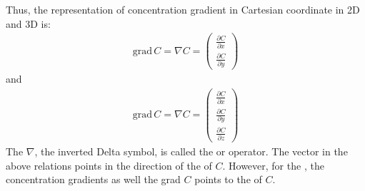 \documentclass[letterpaper,10pt,english]{jupyterBook}
\begin{document}
\sphinxAtStartPar
Thus, the representation of concentration gradient in Cartesian coordinate in 2\sphinxhyphen{}D and 3\sphinxhyphen{}D is:
\begin{equation*}
\begin{split}
\mathrm{grad}\,C = \nabla C=  \begin{pmatrix}
\frac{\partial C}{\partial x}\\
\frac{\partial C}{\partial y}
\end{pmatrix}
\end{split}
\end{equation*}
\sphinxAtStartPar
and
\begin{equation*}
\begin{split}
\mathrm{grad} \,C = \nabla C=  \begin{pmatrix}
\frac{\partial C}{\partial x}\\
\frac{\partial C}{\partial y}\\
\frac{\partial C}{\partial z}
\end{pmatrix}
\end{split}
\end{equation*}
\sphinxAtStartPar
The \(\nabla\), the inverted Delta symbol, is called the  or  operator. The vector  in the above relations points in the direction of the  of \(C\). However, for the , the concentration gradients as well the grad \(C\) points to the  of \(C\).
\end{document}
